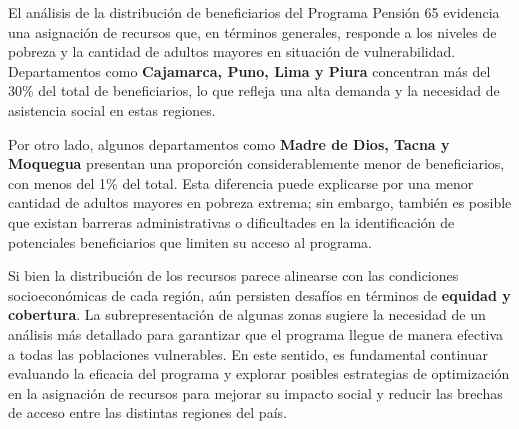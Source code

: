 \documentclass[12pt]{article}
\begin{document}
El análisis de la distribución de beneficiarios del Programa Pensión 65 evidencia una asignación de recursos que, en términos generales, responde a los niveles de pobreza y la cantidad de adultos mayores en situación de vulnerabilidad. Departamentos como \textbf{Cajamarca, Puno, Lima y Piura} concentran más del 30\% del total de beneficiarios, lo que refleja una alta demanda y la necesidad de asistencia social en estas regiones.  

Por otro lado, algunos departamentos como \textbf{Madre de Dios, Tacna y Moquegua} presentan una proporción considerablemente menor de beneficiarios, con menos del 1\% del total. Esta diferencia puede explicarse por una menor cantidad de adultos mayores en pobreza extrema; sin embargo, también es posible que existan barreras administrativas o dificultades en la identificación de potenciales beneficiarios que limiten su acceso al programa.  

Si bien la distribución de los recursos parece alinearse con las condiciones socioeconómicas de cada región, aún persisten desafíos en términos de \textbf{equidad y cobertura}. La subrepresentación de algunas zonas sugiere la necesidad de un análisis más detallado para garantizar que el programa llegue de manera efectiva a todas las poblaciones vulnerables. En este sentido, es fundamental continuar evaluando la eficacia del programa y explorar posibles estrategias de optimización en la asignación de recursos para mejorar su impacto social y reducir las brechas de acceso entre las distintas regiones del país.


\newpage
\end{document}
